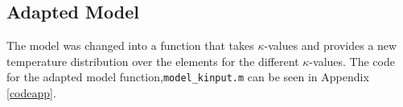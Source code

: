 %
%
%	
%	
	
	\subsection{Adapted Model} \label{adapmodsec}
		The model was changed into a function that takes $\kappa$-values and provides a new temperature distribution over the elements for the different $\kappa$-values. 
The code for the adapted model function,\texttt{model\_kinput.m} can be seen in Appendix \ref{codeapp}.
	
